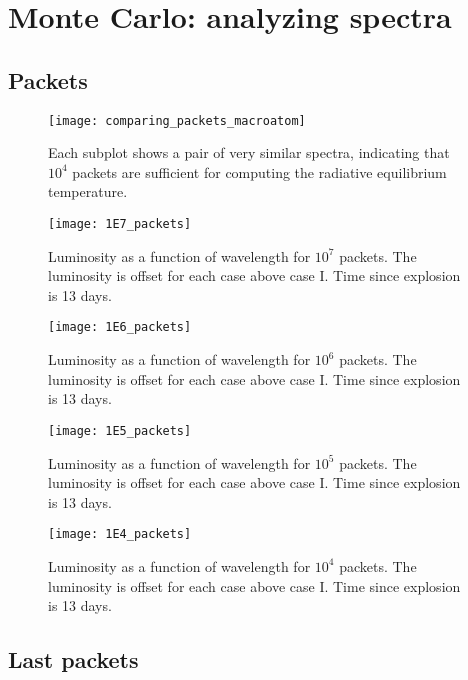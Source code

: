 \documentclass[letterpaper,12pt]{article}
\begin{document}
\clearpage
\section{\label{sec:monte_spectra} Monte Carlo: analyzing spectra}
\subsection{Packets}

\begin{figure}[htpb]
  \centering
  \texttt{[image: comparing\_packets\_macroatom]}
  \caption{
    \label{fig:comparing_packets}
    Each subplot shows a pair of very similar spectra, indicating that $10^4$ packets are sufficient for computing the radiative equilibrium temperature.
}
\end{figure}


\begin{figure}[htpb]
  \centering
  \texttt{[image: 1E7\_packets]}
  \caption{
    \label{fig:pack1E7}
    Luminosity as a function of wavelength for $10^7$ packets. The luminosity is offset for each case above case I. Time since explosion is 13 days. 
}
\end{figure}

\begin{figure}[htpb]
  \centering
  \texttt{[image: 1E6\_packets]}
  \caption{
    \label{fig:pack1E6}
    Luminosity as a function of wavelength for $10^6$ packets. The luminosity is offset for each case above case I. Time since explosion is 13 days.
}
\end{figure}

\begin{figure}[htpb]
  \centering
  \texttt{[image: 1E5\_packets]}
  \caption{
    \label{fig:pack1E5}
    Luminosity as a function of wavelength for $10^5$ packets. The luminosity is offset for each case above case I. Time since explosion is 13 days.
}
\end{figure}

\begin{figure}[htpb]
  \centering
  \texttt{[image: 1E4\_packets]}
  \caption{
    \label{fig:pack1E4}
    Luminosity as a function of wavelength for $10^4$ packets. The luminosity is offset for each case above case I. Time since explosion is 13 days.
}
\end{figure}

\subsection {Last packets}
\end{document}
